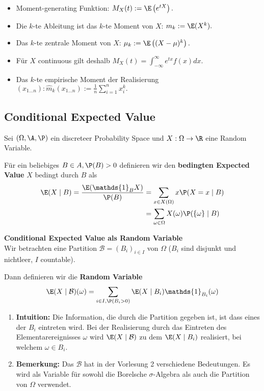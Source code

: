 \begin{subbox}{}
    \begin{itemize}
        \item Moment-generating Funktion: $M_X(t):=\E\left(e^{tX}\right).$ 
        \item Die $k$-te Ableitung ist das $k$-te Moment von $X$: $m_k := \E(X^k).$ 
        \item Das $k$-te zentrale Moment von $X$: $\mu_k := \E\left((X-\mu)^k\right).$ 
        \item Für $X$ continuous gilt deshalb $M_X(t) = \int_{-\infty}^\infty e^{tx} f(x) dx.$ 
        \item Das $k$-te empirische Moment der Realisierung $(x_{1\dots n}): \hat m_k(x_{1\dots n}) := \frac1n \sum_{i=1}^n x_i^k.$ 
    \end{itemize}
    
\end{subbox}

\subsection{Conditional Expected Value}
Sei $(\Omega, \A, \P)$ ein discreteer Probability Space und $X:\Omega \to \R$ eine Random Variable. 

Für ein beliebiges $B \in A, \P(B) > 0$ definieren wir den \textbf{bedingten Expected Value} $X$ bedingt durch $B$ als
\begin{align*}
    \E(X \mid B) = \frac{\E(\mathds{1}_B X)}{\P(B)} &= \sum_{x \in X(\Omega)}x\P(X = x\mid B)\\ 
    &= \sum_{\omega \in \Omega}X(\omega)\P(\{\omega\}\mid B)
\end{align*}

\textbf{Conditional Expected Value als Random Variable}\\
Wir betrachten eine Partition $\mathcal{B} = (B_i)_{i \in I}$ von $\Omega$ ($B_i$ sind disjunkt und nichtleer, $I$ countable). 

Dann definieren wir die \textbf{Random Variable}
$$\E(X \mid \mathcal{B})(\omega) = \sum_{i \in I, \P(B_i > 0)} \E(X \mid B_i) \mathds{1}_{B_i}(\omega)$$ 
\begin{enumerate}
    \item \textbf{Intuition:} Die Information, die durch die Partition gegeben ist, ist dass eines der $B_i$ eintreten wird. Bei der Realisierung durch das Eintreten des Elementarereignisses $\omega$ wird $\E(X \mid \mathcal{B})$ zu dem $\E(X \mid B_i)$ realisiert, bei welchem $\omega \in B_i$.
    \item \textbf{Bemerkung:} Das $\mathcal{B}$ hat in der Vorlesung 2 verschiedene Bedeutungen. Es wird als Variable für sowohl die Borelsche $\sigma$-Algebra als auch die Partition von $\Omega$ verwendet.
\end{enumerate}

